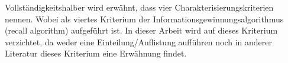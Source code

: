Vollständigkeitshalber wird erwähnt, dass \citet{characterisation_4} vier Charakterisierungskriterien nennen. Wobei als viertes Kriterium der Informationsgewinnungsalgorithmus (recall algorithm) aufgeführt ist. In dieser Arbeit wird auf dieses Kriterium verzichtet, da weder \citet{characterisation_4} eine Einteilung/Auflistung aufführen noch in anderer Literatur dieses Kriterium eine Erwähnung findet.\\



